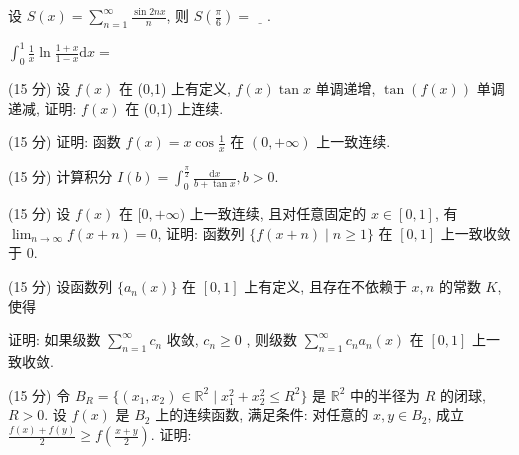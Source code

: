 设 $S(x) = \sum_{n=1}^{\infty} \frac{\sin 2nx}{n}$, 则 $S\left(\frac{\pi}{6}\right) = \underline{\quad}$.\par
$\int_{0}^{1}\frac{1}{x}\ln \frac{1 + x}{1 - x}\mathrm{d}x =$\par
\par{}
(15 分) 设 $f(x)$ 在 (0,1) 上有定义, $f(x) \tan x$ 单调递增, $\tan(f(x))$ 单调递减, 证明: $f(x)$ 在 (0,1) 上连续.\par
\par{}
(15 分) 证明: 函数 $f(x) = x \cos \frac{1}{x}$ 在 $(0, +\infty)$ 上一致连续.\par
\par{}
(15 分) 计算积分 $I(b) = \int_{0}^{\frac{\pi}{2}} \frac{\mathrm{d}x}{b + \tan x}, b > 0$.\par
\par{}
(15 分) 设 $f(x)$ 在 $[0, +\infty)$ 上一致连续, 且对任意固定的 $x \in [0,1]$, 有 $\lim_{n \to \infty} f(x + n) = 0$, 证明: 函数列 $\{f(x + n) \mid n \geq 1\}$ 在 $[0,1]$ 上一致收敛于 0.\par
\par{}
\par{}
(15 分) 设函数列 $\{a_{n}(x)\}$ 在 $[0,1]$ 上有定义, 且存在不依赖于 $x, n$ 的常数 $K$, 使得\par
\nopagebreak[4]
证明: 如果级数  $\sum_{n=1}^{\infty}c_{n}$  收敛,  $c_{n}\geq0$ , 则级数  $\sum_{n=1}^{\infty}c_{n}a_{n}(x)$  在  $[0,1]$  上一致收敛.\par
\par{}
(15 分) 令 $B_{R} = \{(x_{1}, x_{2}) \in \mathbb{R}^{2} \mid x_{1}^{2} + x_{2}^{2} \leq R^{2}\}$ 是 $\mathbb{R}^{2}$ 中的半径为 $R$ 的闭球, $R > 0$. 设 $f(x)$ 是 $B_{2}$ 上的连续函数, 满足条件: 对任意的 $x, y \in B_{2}$, 成立 $\frac{f(x) + f(y)}{2} \geq f\left(\frac{x + y}{2}\right)$. 证明:\par
